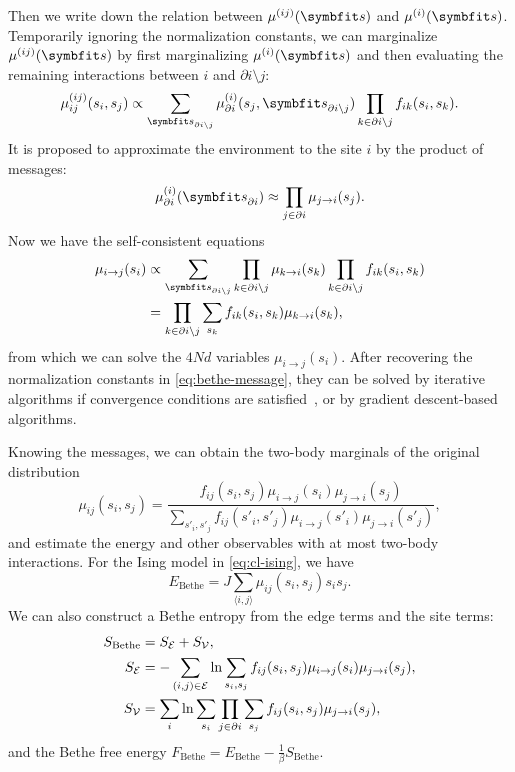 Then we write down the relation between $\mu^{(i j)}(\vs)$ and $\mu^{(i)}(\vs)$. Temporarily ignoring the normalization constants, we can marginalize $\mu^{(i j)}(\vs)$ by first marginalizing $\mu^{(i)}(\vs)$ and then evaluating the remaining interactions between $i$ and $\partial i \setminus j$:
\begin{equation}
\mu^{(i j)}_{i j}(s_i, s_j) \propto \sum_{\vs_{\partial i \setminus j}} \mu^{(i)}_{\partial i}(s_j, \vs_{\partial i \setminus j}) \prod_{k \in \partial i \setminus j} f_{i k}(s_i, s_k).
\end{equation}
It is proposed to approximate the environment to the site $i$ by the product of messages:
\begin{equation}
\mu^{(i)}_{\partial i}(\vs_{\partial i}) \approx \prod_{j \in \partial i} \mu_{j \to i}(s_j).
\label{eq:bethe-prob}
\end{equation}
Now we have the self-consistent equations
\begin{align}
\mu_{i \to j}(s_i) &\propto \sum_{\vs_{\partial i \setminus j}} \prod_{k \in \partial i \setminus j} \mu_{k \to i}(s_k) \prod_{k \in \partial i \setminus j} f_{i k}(s_i, s_k) \\
&= \prod_{k \in \partial i \setminus j} \sum_{s_k} f_{i k}(s_i, s_k) \mu_{k \to i}(s_k),
\label{eq:bethe-message}
\end{align}
from which we can solve the $4 N d$ variables $\mu_{i \to j}(s_i)$. After recovering the normalization constants in \cref{eq:bethe-message}, they can be solved by iterative algorithms if convergence conditions are satisfied~\cite{mooij2007sufficient}, or by gradient descent-based algorithms.

Knowing the messages, we can obtain the two-body marginals of the original distribution
\begin{equation}
\mu_{i j}(s_i, s_j) = \frac{f_{i j}(s_i, s_j) \mu_{i \to j}(s_i) \mu_{j \to i}(s_j)}{\sum_{s'_i, s'_j} f_{i j}(s'_i, s'_j) \mu_{i \to j}(s'_i) \mu_{j \to i}(s'_j)},
\end{equation}
and estimate the energy and other observables with at most two-body interactions. For the Ising model in \cref{eq:cl-ising}, we have
\begin{equation}
E_\text{Bethe} = J \sum_{\langle i, j \rangle} \mu_{i j}(s_i, s_j) s_i s_j.
\end{equation}
We can also construct a Bethe entropy from the edge terms and the site terms:
\begin{align}
S_\text{Bethe} &= S_{\mathcal{E}} + S_{\mathcal{V}}, \\
S_{\mathcal{E}} &= -\sum_{(i, j) \in \mathcal{E}} \ln \sum_{s_i, s_j} f_{i j}(s_i, s_j) \mu_{i \to j}(s_i) \mu_{j \to i}(s_j), \\
S_{\mathcal{V}} &= \sum_i \ln \sum_{s_i} \prod_{j \in \partial i} \sum_{s_j} f_{i j}(s_i, s_j) \mu_{j \to i}(s_j),
\end{align}
and the Bethe free energy $F_\text{Bethe} = E_\text{Bethe} - \frac{1}{\beta} S_\text{Bethe}$.


